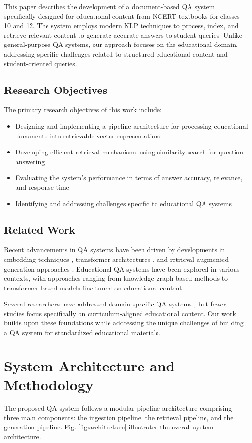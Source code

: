 \documentclass[10pt,conference]{IEEEtran}
\begin{document}
This paper describes the development of a document-based QA system specifically designed for educational content from NCERT textbooks for classes 10 and 12. The system employs modern NLP techniques to process, index, and retrieve relevant content to generate accurate answers to student queries. Unlike general-purpose QA systems, our approach focuses on the educational domain, addressing specific challenges related to structured educational content and student-oriented queries.

\subsection{Research Objectives}
The primary research objectives of this work include:
\begin{itemize}
    \item Designing and implementing a pipeline architecture for processing educational documents into retrievable vector representations
    \item Developing efficient retrieval mechanisms using similarity search for question answering
    \item Evaluating the system's performance in terms of answer accuracy, relevance, and response time
    \item Identifying and addressing challenges specific to educational QA systems
\end{itemize}

\subsection{Related Work}
Recent advancements in QA systems have been driven by developments in embedding techniques \cite{b3}, transformer architectures \cite{b4}, and retrieval-augmented generation approaches \cite{b5}. Educational QA systems have been explored in various contexts, with approaches ranging from knowledge graph-based methods \cite{b6} to transformer-based models fine-tuned on educational content \cite{b7}.

Several researchers have addressed domain-specific QA systems \cite{b8}, but fewer studies focus specifically on curriculum-aligned educational content. Our work builds upon these foundations while addressing the unique challenges of building a QA system for standardized educational materials.

\section{System Architecture and Methodology}
The proposed QA system follows a modular pipeline architecture comprising three main components: the ingestion pipeline, the retrieval pipeline, and the generation pipeline. Fig. \ref{fig:architecture} illustrates the overall system architecture.
\end{document}
